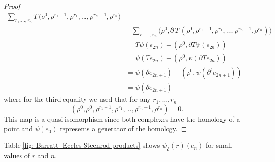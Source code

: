 \begin{proof}
\begin{align*}
	\sum_{r_1, \dots, r_n}
	T \, \big( \rho^0, \rho^{r_1-1}, \rho^{r_1}, \dots, \rho^{r_n - 1}, \rho^{r_n} \big) \\ & -
	\sum_{r_1, \dots, r_n}
	\big(\rho^0, \partial \, T \, (\rho^0, \rho^{r_1-1}, \rho^{r_1}, \dots, \rho^{r_n - 1}, \rho^{r_n}) \big) \\ & =
	T \psi(e_{2n}) - (\rho^0, \partial T \psi (e_{2n})) \\ & =
	\psi(T e_{2n}) - (\rho^0, \psi (\partial T e_{2n})) \\ & =
	\psi(\partial e_{2n+1}) - (\rho^0, \psi (\partial^2 e_{2n+1})) \\ & =
	\psi(\partial e_{2n+1})
	\end{align*}
	where for the third equality we used that for any $r_1, \dots, r_n$
	\begin{equation*}
	(\rho^0, \rho^0, \rho^{r_1-1}, \rho^{r_1}, \dots, \rho^{r_n - 1}, \rho^{r_n}) = 0.
	\end{equation*}
	This map is a quasi-isomorphism since both complexes have the homology of a point and $\psi(e_0)$ represents a generator of the homology.
\end{proof}

\begin{example}
	Table \ref{fig: Barratt--Eccles Steenrod products} shows $\psi_{\mathcal E}(r)(e_n)$ for small values of $r$ and $n$.
\end{example}

\begin{table}[h]
	\centering
	\vspace*{3pt}
	\caption{The elements $\psi_{\mathcal E}(r)(e_n)$ for small values of $r$ and $n$ where we are denoting $(\rho^{r_0}, \dots, \rho^{r_n})$ simply by $(r_0, \dots, r_n)$.}
	\label{fig: Barratt--Eccles Steenrod products}
\end{table}

